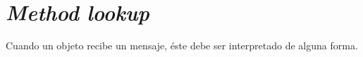 \section{\textit{Method lookup}}
  \label{sec:lookup}

  Cuando un objeto recibe un mensaje, éste debe ser interpretado de alguna forma.
  
%